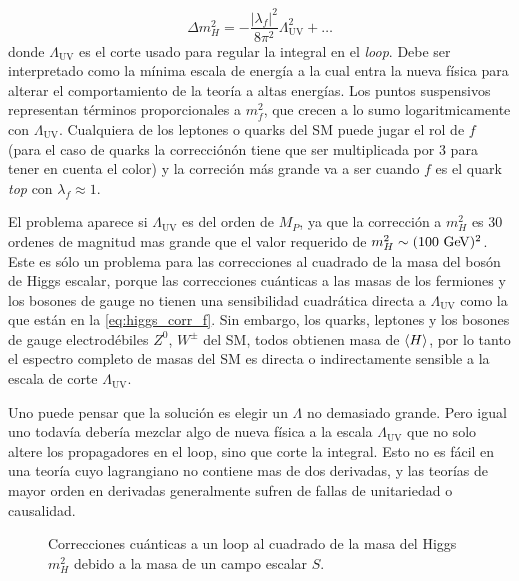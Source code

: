 \begin{equation}
  \Delta m_H^2 = -\frac{|\lambda_f|^2}{8\pi^2} \Lambda^2_\text{UV} + \ldots
  \label{eq:higgs_corr_f}
\end{equation}
%
donde $\Lambda_\text{UV}$ es el corte usado para regular la integral en el
\emph{loop}. Debe ser interpretado como la m\'inima escala de energ\'ia a la
cual entra la nueva física para alterar el comportamiento de la teoría a altas
energías. Los puntos suspensivos representan términos proporcionales a $m_f^2$,
que crecen a lo sumo logaritmicamente con $\Lambda_\text{UV}$. Cualquiera de los
leptones o quarks del SM puede jugar el rol de $f$ (para el caso de quarks la
correcciónón tiene que ser multiplicada por 3 para tener en cuenta el color) y
la correción m\'as grande va a ser cuando $f$ es el quark \emph{top} con
$\lambda_f \approx 1$.

El problema aparece si $\Lambda_\text{UV}$ es del orden de $M_P$, ya que la
corrección a $m_H^2$ es 30 ordenes de magnitud mas grande que el valor requerido
de $m_H^2 \sim (100 \gev)^2$. Este es sólo un problema para las correcciones al
cuadrado de la masa del bosón de Higgs escalar, porque las correcciones
cuánticas a las masas de los fermiones y los bosones de gauge no tienen una
sensibilidad cuadrática directa a $\Lambda_\text{UV}$ como la que están en la
\cref{eq:higgs_corr_f}. Sin embargo, los quarks, leptones y los bosones de gauge
electrodébiles $Z^0$, $W^{\pm}$ del SM, todos obtienen masa de $\langle H \rangle$, por
lo tanto el espectro completo de masas del SM es directa o indirectamente
sensible a la escala de corte $\Lambda_\text{UV}$.

Uno puede pensar que la solución es elegir un $\Lambda$ no demasiado grande.
Pero igual uno todavía debería mezclar algo de nueva física a la escala
$\Lambda_\text{UV}$ que no solo altere los propagadores en el loop, sino que
corte la integral. Esto no es fácil en una teoría cuyo lagrangiano no contiene
mas de dos derivadas, y las teorías de mayor orden en derivadas generalmente
sufren de fallas de unitariedad o causalidad.

\begin{figure}[!htbp]
  \centering 
  \caption{Correcciones cu\'anticas a un loop al cuadrado de la masa del Higgs
    $m_H^2$ debido a la masa de un campo escalar $S$.}
  \label{fig:higgs_correction_s}
\end{figure}

